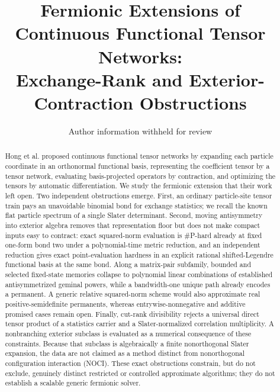 \documentclass[aps,pra,reprint,superscriptaddress,nofootinbib,longbibliography,showkeys]{revtex4-2}
\theoremstyle{definition}
\begin{document}
\title{Fermionic Extensions of Continuous Functional Tensor Networks:\\
Exchange-Rank and Exterior-Contraction Obstructions}
\author{Author information withheld for review}

\begin{abstract}
Hong et al. proposed continuous functional tensor networks by expanding each
particle coordinate in an orthonormal functional basis, representing the
coefficient tensor by a tensor network, evaluating basis-projected operators
by contraction, and optimizing the tensors by automatic differentiation.  We
study the fermionic extension that their work left open.  Two independent
obstructions emerge.  First, an ordinary particle-site tensor train pays an
unavoidable binomial bond for exchange statistics; we recall the known flat
particle spectrum of a single Slater determinant.  Second, moving
antisymmetry into exterior algebra
removes that representation floor but does not make compact inputs easy to
contract: exact squared-norm evaluation is \#P-hard already at fixed one-form
bond two under a polynomial-time metric reduction, and an independent
reduction gives exact point-evaluation hardness in an explicit rational
shifted-Legendre functional basis at the same bond.  Along a matrix-pair
subfamily, bounded and selected fixed-state memories collapse to polynomial
linear combinations of established antisymmetrized geminal powers, while a
bandwidth-one unique path already encodes a permanent.  A generic relative
squared-norm scheme would also approximate real positive-semidefinite
permanents, whereas entrywise-nonnegative and additive promised cases remain
open.  Finally, cut-rank divisibility rejects a universal direct tensor product
of a statistics carrier and a Slater-normalized correlation multiplicity.  A
nonbranching exterior subclass is evaluated as a numerical consequence of
these constraints.  Because that
subclass is algebraically a finite nonorthogonal Slater expansion, the data are
not claimed as a method distinct from nonorthogonal configuration interaction
(NOCI).  These exact obstructions constrain, but do not exclude, genuinely
distinct restricted or controlled approximate algorithms; they do not
establish a scalable generic fermionic solver.
\end{abstract}
\maketitle
\end{document}
